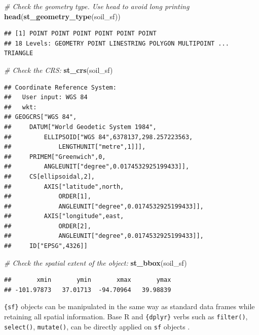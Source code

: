 \documentclass[
  10pt,
  b5paper,
  oneside]{book}
\newenvironment{Shaded}{\begin{snugshade}}{\end{snugshade}}
\newcommand{\CommentTok}[1]{\textcolor[rgb]{0.56,0.35,0.01}{\textit{#1}}}
\newcommand{\FunctionTok}[1]{\textcolor[rgb]{0.13,0.29,0.53}{\textbf{#1}}}
\newcommand{\NormalTok}[1]{#1}
\begin{document}
\begin{Shaded}
\begin{Highlighting}[]
\CommentTok{\# Check the geometry type. Use head to avoid long printing}
\FunctionTok{head}\NormalTok{(}\FunctionTok{st\_geometry\_type}\NormalTok{(soil\_sf))}
\end{Highlighting}
\end{Shaded}

\begin{verbatim}
## [1] POINT POINT POINT POINT POINT POINT
## 18 Levels: GEOMETRY POINT LINESTRING POLYGON MULTIPOINT ... TRIANGLE
\end{verbatim}

\begin{Shaded}
\begin{Highlighting}[]
\CommentTok{\# Check the CRS:}
\FunctionTok{st\_crs}\NormalTok{(soil\_sf)}
\end{Highlighting}
\end{Shaded}

\begin{verbatim}
## Coordinate Reference System:
##   User input: WGS 84 
##   wkt:
## GEOGCRS["WGS 84",
##     DATUM["World Geodetic System 1984",
##         ELLIPSOID["WGS 84",6378137,298.257223563,
##             LENGTHUNIT["metre",1]]],
##     PRIMEM["Greenwich",0,
##         ANGLEUNIT["degree",0.0174532925199433]],
##     CS[ellipsoidal,2],
##         AXIS["latitude",north,
##             ORDER[1],
##             ANGLEUNIT["degree",0.0174532925199433]],
##         AXIS["longitude",east,
##             ORDER[2],
##             ANGLEUNIT["degree",0.0174532925199433]],
##     ID["EPSG",4326]]
\end{verbatim}

\begin{Shaded}
\begin{Highlighting}[]
\CommentTok{\# Check the spatial extent of the object:}
\FunctionTok{st\_bbox}\NormalTok{(soil\_sf)}
\end{Highlighting}
\end{Shaded}

\begin{verbatim}
##       xmin       ymin       xmax       ymax 
## -101.97873   37.01713  -94.70964   39.98839
\end{verbatim}

\texttt{\{sf\}} objects can be manipulated in the same way as standard data frames while retaining all spatial information.
Base R and \texttt{\{dplyr\}} verbs such as \texttt{filter()}, \texttt{select()}, \texttt{mutate()}, can be directly applied on \texttt{sf} objects .
\end{document}

